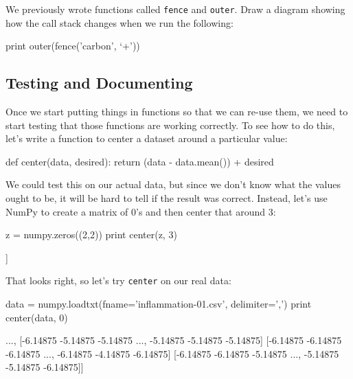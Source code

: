 \documentclass{book}
\begin{document}
\begin{challenge}
  We previously wrote functions called \texttt{fence} and
  \texttt{outer}. Draw a diagram showing how the call stack changes when
  we run the following:
\begin{VerbIn}
print outer(fence('carbon', `+'))
\end{VerbIn}
\end{challenge}

\subsection{Testing and Documenting}

Once we start putting things in functions so that we can re-use them, we
need to start testing that those functions are working correctly. To see
how to do this, let's write a function to center a dataset around a
particular value:

\begin{VerbIn}
def center(data, desired):
    return (data - data.mean()) + desired
\end{VerbIn}

We could test this on our actual data, but since we don't know what the
values ought to be, it will be hard to tell if the result was correct.
Instead, let's use NumPy to create a matrix of 0's and then center that
around 3:

\begin{VerbIn}
z = numpy.zeros((2,2))
print center(z, 3)
\end{VerbIn}

\begin{VerbOut}
[[ 3.  3.]
 [ 3.  3.]]
\end{VerbOut}

That looks right, so let's try \texttt{center} on our real data:

\begin{VerbIn}
data = numpy.loadtxt(fname='inflammation-01.csv', delimiter=',')
print center(data, 0)
\end{VerbIn}

\begin{VerbOut}
[[-6.14875 -6.14875 -5.14875 ..., -3.14875 -6.14875 -6.14875]
 [-6.14875 -5.14875 -4.14875 ..., -5.14875 -6.14875 -5.14875]
 [-6.14875 -5.14875 -5.14875 ..., -4.14875 -5.14875 -5.14875]
 ...,
 [-6.14875 -5.14875 -5.14875 ..., -5.14875 -5.14875 -5.14875]
 [-6.14875 -6.14875 -6.14875 ..., -6.14875 -4.14875 -6.14875]
 [-6.14875 -6.14875 -5.14875 ..., -5.14875 -5.14875 -6.14875]]
\end{VerbOut}
\end{document}

